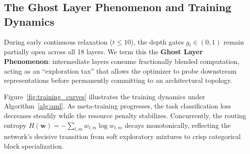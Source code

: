\documentclass[11pt, a4paper]{article}
\begin{document}
\subsection{The Ghost Layer Phenomenon and Training Dynamics}

During early continuous relaxation ($t \le 10$), the depth gates $g_l \in (0, 1)$ remain partially open across all 18 layers. We term this the \textbf{Ghost Layer Phenomenon}: intermediate layers consume fractionally blended computation, acting as an ``exploration tax'' that allows the optimizer to probe downstream representations before permanently committing to an architectural topology. 

Figure~\ref{fig:training_curves} illustrates the training dynamics under Algorithm~\ref{alg:aml}. As meta-training progresses, the task classification loss decreases steadily while the resource penalty stabilizes. Concurrently, the routing entropy $H(\mathbf{w}) = -\sum_{l, m} w_{l, m} \log w_{l, m}$ decays monotonically, reflecting the network's decisive transition from soft exploratory mixtures to crisp categorical block specialization.
\end{document}
